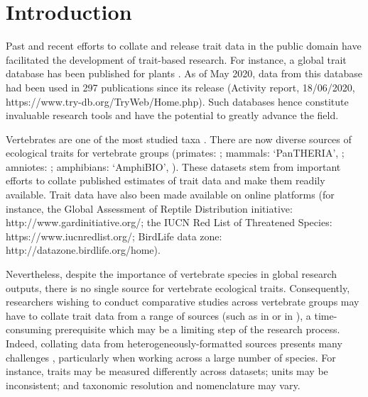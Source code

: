 \section{Introduction}

Past and recent efforts to collate and release trait data in the public domain have facilitated the development of trait-based research. For instance, a global trait database has been published for plants \citep{Kattge2011}. As of May 2020, data from this database had been used in 297 publications since its release (Activity report, 18/06/2020, https://www.try-db.org/TryWeb/Home.php). Such databases hence constitute invaluable research tools and have the potential to greatly advance the field.

Vertebrates are one of the most studied taxa \citep{Titley2017}. There are now diverse sources of ecological traits for vertebrate groups (primates: \cite{Galan-Acedo2019}; mammals: `PanTHERIA', \cite{Jones2009}; amniotes: \cite{Myhrvold2015}; amphibians: ‘AmphiBIO’, \cite{Oliveira2017}). These datasets stem from important efforts to collate published estimates of trait data and make them readily available. Trait data have also been made available on online platforms (for instance, the Global Assessment of Reptile Distribution initiative: http://www.gardinitiative.org/; the IUCN Red List of Threatened Species: https://www.iucnredlist.org/; BirdLife data zone: http://datazone.birdlife.org/home).

Nevertheless, despite the importance of vertebrate species in global research outputs, there is no single source for vertebrate ecological traits. Consequently, researchers wishing to conduct comparative studies across vertebrate groups may have to collate trait data from a range of sources (such as in \citet{Cooke2019a, Cooke2019b} or in \citet{Gonzalez2018}), a time-consuming prerequisite which may be a limiting step of the research process. Indeed, collating data from heterogeneously-formatted sources presents many challenges \citep{Schneider2019}, particularly when working across a large number of species. For instance, traits may be measured differently across datasets; units may be inconsistent; and taxonomic resolution and nomenclature may vary.

